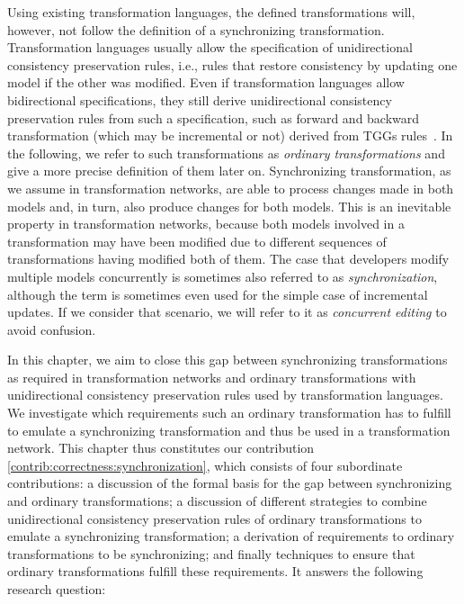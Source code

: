 Using existing transformation languages, the defined transformations will, however, not follow the definition of a synchronizing transformation.
Transformation languages usually allow the specification of unidirectional consistency preservation rules, i.e., rules that restore consistency by updating one model if the other was modified.
Even if transformation languages allow bidirectional specifications, they still derive unidirectional consistency preservation rules from such a specification, such as forward and backward transformation (which may be incremental or not) derived from \glspl{TGG} rules~\cite{leblebici2014IncrementalTGGSurvey-GTVMT}.
In the following, we refer to such transformations as \emph{ordinary transformations} and give a more precise definition of them later on.
Synchronizing transformation, as we assume in transformation networks, are able to process changes made in both models and, in turn, also produce changes for both models.
This is an inevitable property in transformation networks, because both models involved in a transformation may have been modified due to different sequences of transformations having modified both of them.
The case that developers modify multiple models concurrently is sometimes also referred to as \emph{synchronization}, although the term is sometimes even used for the simple case of incremental updates.
If we consider that scenario, we will refer to it as \emph{concurrent editing} to avoid confusion.

In this chapter, we aim to close this gap between synchronizing transformations as required in transformation networks and ordinary transformations with unidirectional consistency preservation rules used by transformation languages.
We investigate which requirements such an ordinary transformation has to fulfill to emulate a synchronizing transformation and thus be used in a transformation network.
This chapter thus constitutes our contribution \autoref{contrib:correctness:synchronization}, which consists of four subordinate contributions: a discussion of the formal basis for the gap between synchronizing and ordinary transformations; a discussion of different strategies to combine unidirectional consistency preservation rules of ordinary transformations to emulate a synchronizing transformation; a derivation of requirements to ordinary transformations to be synchronizing; and finally techniques to ensure that ordinary transformations fulfill these requirements.
It answers the following research question:

